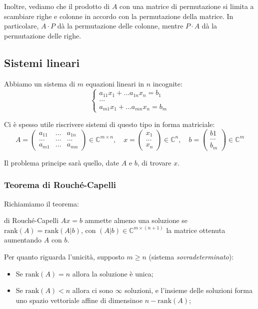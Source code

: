 \documentclass[a4paper,11pt]{article}
\begin{document}
Inoltre, vediamo che il prodotto di $A$ con una matrice di permutazione si limita a scambiare righe e colonne in accordo con la permutazione della matrice.
In particolare, $A \cdot P$ dà la permutazione delle colonne, mentre $P \cdot A$ dà la permutazione delle righe.

\subsection{Sistemi lineari}
Abbiamo un sistema di $m$ equazioni lineari in $n$ incognite:
\[
	\begin{cases}
		a_{11} x_1 + ... a_{1n}	x_n = b_1 \\ 
		... \\
		a_{m1} x_1 + ... a_{mn}	x_n = b_m
	\end{cases}
\]

Ci è spesso utile riscrivere sistemi di questo tipo in forma matriciale:
$$
A = \begin{pmatrix}
	a_{11} & ... & a_{1n} \\ 
	... & ... & ... \\
	a_{m1} & ... & a_{mn}
\end{pmatrix} \in \mathbb{C}^{m \times n}, \quad
x = \begin{pmatrix}
	x_1 \\ ...\\ x_n
\end{pmatrix} \in \mathbb{C}^{n}, \quad
b = \begin{pmatrix}
	b1 \\ ... \\ b_m
\end{pmatrix} \in \mathbb{C}^{m}
$$

Il problema principe sarà quello, date $A$ e $b$, di trovare $x$.

\subsubsection{Teorema di Rouché-Capelli}
Richiamiamo il teorema:
\begin{theorem}{di Rouché-Capelli}
	$Ax = b$ ammette almeno una soluzione se $\mathrm{rank}(A) = \mathrm{rank}(A | b)$, con $(A|b) \in \mathbb{C}^{m \times (n + 1)}$ la matrice ottenuta aumentando $A$ con $b$.

	Per quanto riguarda l'unicità, supposto $m \geq n$ (sistema \textit{sovradeterminato}):
	\begin{itemize}
		\item Se $\mathrm{rank}(A) = n$ allora la soluzione è unica;
		\item Se $\mathrm{rank}(A) < n$ allora ci sono $\infty$ soluzioni, e l'insieme delle soluzioni forma uno spazio vettoriale affine di dimensinoe $n - \mathrm{rank}(A)$;
	\end{itemize}
\end{theorem}
\end{document}
